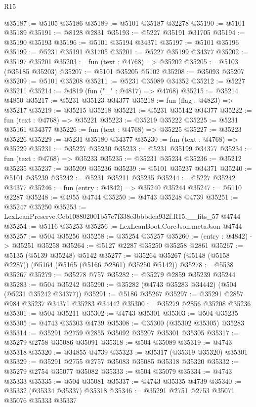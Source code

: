 \begin{lexlean}{R15}
\begin{coremodule}
{{{{{{{{{{{@35187 := @5105 @35186
@35189 := @5101 @35187 @32278
@35190 := @5101 @35189
@35191 := @8128 @2831
@35193 := @5227 @35191 @31705
@35194 := @35190 @35193
@35196 := @5101 @35194 @34371
@35197 := @5101 @35196
@35199 := @5231 @35191 @31705
@35201 := @5227 @35199 @34377
@35202 := @35197 @35201
@35203 := fun (text : @4768) => @35202
@35205 := @5103 (@35185 @35203)
@35207 := @5101 @35205 @5102
@35208 := @35093 @35207
@35209 := @5101 @35208
@35211 := @5231 @35089 @34352
@35212 := @5227 @35211
@35214 := @4819 (fun ("_" : @4817) => @4768)
@35215 := @35214 @4850
@35217 := @5231 @35123 @34377
@35218 := fun (flag : @4823) => @35217
@35219 := @35215 @35218
@35221 := @5231 @35142 @34377
@35222 := fun (text : @4768) => @35221
@35223 := @35219 @35222
@35225 := @5231 @35161 @34377
@35226 := fun (text : @4768) => @35225
@35227 := @35223 @35226
@35229 := @5231 @35180 @34377
@35230 := fun (text : @4768) => @35229
@35231 := @35227 @35230
@35233 := @5231 @35199 @34377
@35234 := fun (text : @4768) => @35233
@35235 := @35231 @35234
@35236 := @35212 @35235
@35237 := @35209 @35236
@35239 := @5101 @35237 @34371
@35240 := @5101 @35239
@35242 := @5231 @35211 @35235
@35244 := @5227 @35242 @34377
@35246 := fun (entry : @4842) => @35240 @35244
@35247 := @5110 @2287
@35248 := @4955 @4744
@35250 := @4743 @35248 @4739
@35251 := @35247 @35250
@35253 := LexLeanPreserve.Ceb108802001b57e7f338e3bbbdea932f.R15.__fits_57 @4744
@35254 := @5116 @35253
@35256 := LexLeanBoot.CoreJson.metaJson @4744
@35257 := @504 @35256
@35258 := @35254 @35257
@35260 := (entry : @4842) -> @35251 @35258
@35264 := @5127 @2287 @35250 @35258 @2861
@35267 := @5135 (@5139 @35248) @5142
@35277 := @35264 @35267 (@5148 (@5158 @2287)) (@5164 (@5165 (@5166 @2861) @35250 @5142))
@35278 := @5538 @35267
@35279 := @35278 @757
@35282 := @35279 @2859 @35239 @35244
@35283 := @504 @35242
@35290 := @35282 (@4743 @35283 @34442) (@504 (@5231 @35242 @34377))
@35291 := @5186 @35267
@35297 := @35291 @2857 @984 @35237 @34371 @35283 @34442
@35300 := @35279 @2856 @35208 @35236
@35301 := @504 @35211
@35302 := @4743 @35301
@35303 := @504 @35235
@35305 := @4743 @35303 @4739
@35308 := @35300 (@35302 @35305) @35283
@35314 := @35291 @2759 @2855 @35092 @35207 @35301 @35305
@35317 := @35279 @2758 @35086 @35091
@35318 := @504 @35089
@35319 := @4743 @35318
@35320 := @34855 @4739
@35323 := @35317 (@35319 @35320) @35301
@35329 := @35291 @2755 @2757 @35083 @35085 @35318 @35320
@35332 := @35279 @2754 @35077 @35082
@35333 := @504 @35079
@35334 := @4743 @35333
@35335 := @504 @35081
@35337 := @4743 @35335 @4739
@35340 := @35332 (@35334 @35337) @35318
@35346 := @35291 @2751 @2753 @35071 @35076 @35333 @35337
}}}}}}}}}}}
\end{coremodule}
\end{lexlean}
